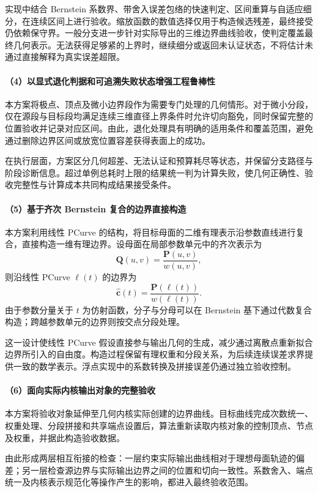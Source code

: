实现中结合 Bernstein 系数界、带舍入误差包络的快速判定、区间重算与自适应细分，在连续区间上进行验收。缩放函数的数值选择仅用于构造候选残差，最终接受仍依赖保守界。一般分支进一步针对实际导出的三维边界曲线验收，使判定覆盖最终几何表示。无法获得足够紧的上界时，继续细分或返回未认证状态，不将估计未通过直接解释为真实误差超限。

\paragraph{（4）以显式退化判据和可追溯失败状态增强工程鲁棒性}
本方案将极点、顶点及微小边界段作为需要专门处理的几何情形。对于微小分段，仅在源段与目标段均满足连续三维直径上界条件时允许切向豁免，同时保留完整的位置验收并记录对应区间。由此，退化处理具有明确的适用条件和覆盖范围，避免通过删除边界区间或放宽位置容差获得表面上的成功。

在执行层面，方案区分几何超差、无法认证和预算耗尽等状态，并保留分支路径与阶段诊断信息。超过单例总耗时上限的结果统一判为计算失败，使几何正确性、验收完整性与计算成本共同构成结果接受条件。

\paragraph{（5）基于齐次 Bernstein 复合的边界直接构造}
本方案利用线性 PCurve 的结构，将目标母面的二维有理表示沿参数直线进行复合，直接构造一维有理边界。设母面在局部参数单元中的齐次表示为
\[\mathbf Q(u,v)=\frac{\mathbf P(u,v)}{w(u,v)},\]
则沿线性 PCurve $\boldsymbol{\ell}(t)$ 的边界为
\[\widehat{\mathbf c}(t)=\frac{\mathbf P(\boldsymbol{\ell}(t))}{w(\boldsymbol{\ell}(t))}.\]
由于参数分量关于 $t$ 为仿射函数，分子与分母可以在 Bernstein 基下通过代数复合构造；跨越参数单元的边界则按交点分段处理。

这一设计使线性 PCurve 假设直接参与输出几何的生成，减少通过离散点重新拟合边界所引入的自由度。构造过程保留有理权重和分段关系，为后续连续误差求界提供一致的数学表示。浮点实现中的系数转换及拼接误差仍通过独立验收控制。

\paragraph{（6）面向实际内核输出对象的完整验收}
本方案将验收对象延伸至几何内核实际创建的边界曲线。目标曲线完成次数统一、权重处理、分段拼接和共享端点设置后，算法重新读取内核对象的控制顶点、节点及权重，并据此构造验收数据。

由此形成两层相互衔接的检查：一层约束实际输出曲线相对于理想母面轨迹的偏差；另一层检查源边界与实际输出边界之间的位置和切向一致性。系数舍入、端点统一及内核表示规范化等操作产生的影响，都进入最终验收范围。

